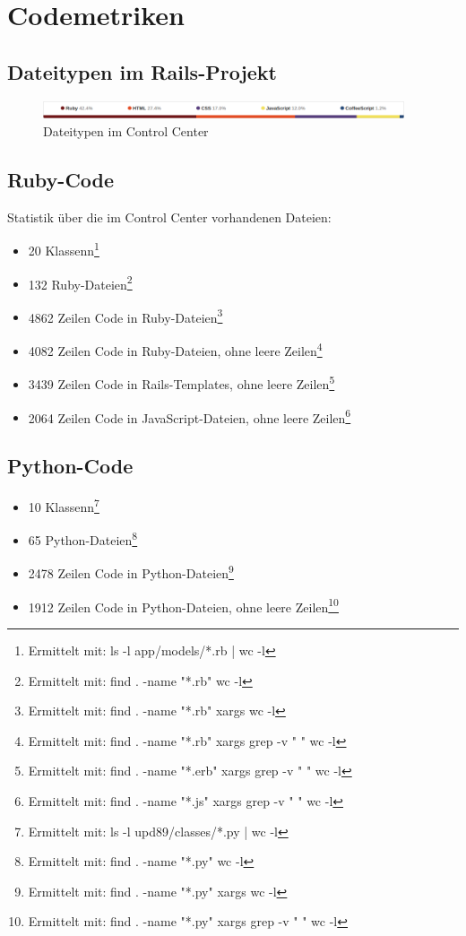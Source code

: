 \chapter{Codemetriken} \label{appendix:code-metrics}

\section*{Dateitypen im Rails-Projekt}

\begin{figure}
  \centering
    \includegraphics[width=0.95\textwidth]{fig/github_filetypes}
  \caption{Dateitypen im Control Center}
  \label{fig:metrics-filetypes}
\end{figure}

\section*{Ruby-Code}

Statistik über die im Control Center vorhandenen Dateien:
\begin{itemize}
\item 20 Klassenn\footnote{Ermittelt mit: ls -l app/models/*.rb | wc -l}
\item 132 Ruby-Dateien\footnote{Ermittelt mit: find . -name "*.rb" \textbar wc -l}
\item 4862 Zeilen Code in Ruby-Dateien\footnote{Ermittelt mit: find . -name "*.rb" \textbar xargs wc -l}
\item 4082 Zeilen Code in Ruby-Dateien, ohne leere Zeilen\footnote{Ermittelt mit: find . -name "*.rb" \textbar xargs grep -v "  " \textbar wc -l}
\item 3439 Zeilen Code in Rails-Templates, ohne leere Zeilen\footnote{Ermittelt mit: find . -name "*.erb" \textbar xargs grep -v "  " \textbar wc -l}
\item 2064 Zeilen Code in JavaScript-Dateien, ohne leere Zeilen\footnote{Ermittelt mit: find . -name "*.js" \textbar xargs grep -v "  " \textbar wc -l}
\end{itemize}

\section*{Python-Code}
\begin{itemize}
\item 10 Klassenn\footnote{Ermittelt mit: ls -l upd89/classes/*.py | wc -l}
\item 65 Python-Dateien\footnote{Ermittelt mit: find . -name "*.py" \textbar wc -l}
\item 2478 Zeilen Code in Python-Dateien\footnote{Ermittelt mit: find . -name "*.py" \textbar xargs wc -l}
\item 1912 Zeilen Code in Python-Dateien, ohne leere Zeilen\footnote{Ermittelt mit: find . -name "*.py" \textbar xargs grep -v "  " \textbar wc -l}
\end{itemize}